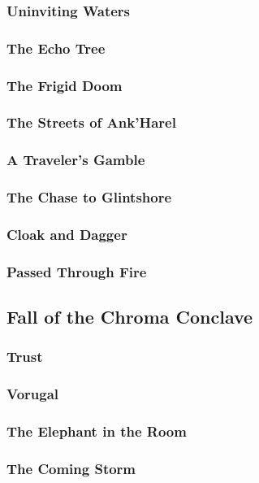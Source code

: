         \subsubsection{Uninviting Waters}
        \subsubsection{The Echo Tree}
        \subsubsection{The Frigid Doom}
        \subsubsection{The Streets of Ank'Harel}
        \subsubsection{A Traveler's Gamble}
        \subsubsection{The Chase to Glintshore}
        \subsubsection{Cloak and Dagger}
        \subsubsection{Passed Through Fire}
        
    \newpage
    \subsection{Fall of the Chroma Conclave} \vspace*{\fill}
    \newpage
        \subsubsection{Trust}
        \subsubsection{Vorugal}
        \subsubsection{The Elephant in the Room}
        \subsubsection{The Coming Storm}
